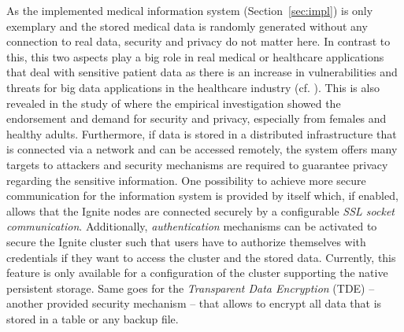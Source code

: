 As the implemented medical information system (Section~\ref{sec:impl}) is only exemplary and the stored medical data is randomly generated without any connection to
real data, security and privacy do not matter here. 
In contrast to this, this two aspects play a big role in real medical or healthcare applications that deal with sensitive patient data as there is an increase in
vulnerabilities and threats for big data applications in the healthcare industry (cf. \citet{Patil2014}). This is also revealed
in the study of \citet{Wilkowska2012} where the empirical investigation showed the endorsement and demand for security and privacy, especially from females and
healthy adults.
Furthermore, if data is stored in a distributed infrastructure that is connected via a network and can be accessed remotely, the system offers many targets
to attackers and security mechanisms are required to guarantee privacy regarding the sensitive information. One possibility to achieve more secure communication 
for the information system is provided by  itself which, if enabled, allows that the Ignite nodes are connected securely by a configurable 
\emph{SSL socket communication}. Additionally, \emph{authentication} mechanisms can be activated to secure the Ignite cluster such that users have to authorize 
themselves with credentials if they want to access the cluster and the stored data. Currently, this feature is only available for a configuration of the cluster
supporting the native persistent storage. Same goes for the \emph{Transparent Data Encryption} (TDE) -- another provided security mechanism -- that allows to 
encrypt all data that is stored in a table or any backup file.

